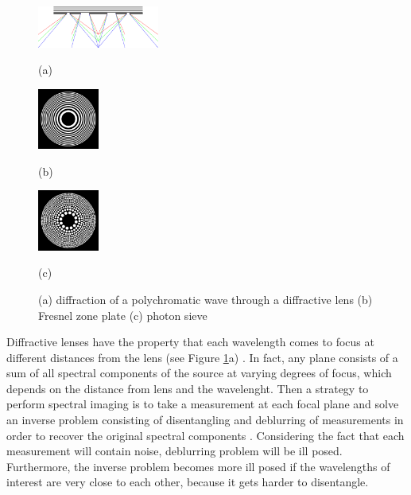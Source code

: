 \documentclass{article}
\begin{document}
\begin{figure}[htb]

\begin{minipage}[b]{0.48\linewidth}
  \centering
  \centerline{\includegraphics[width=4.0cm]{diffraction_ps_rgb}}
  \centerline{(a)}\medskip
\end{minipage}
\hfill
\begin{minipage}[b]{0.24\linewidth}
  \centering
  \centerline{\includegraphics[width=2.0cm]{zoneplate}}
  \centerline{(b)}\medskip
\end{minipage}
\hfill
\begin{minipage}[b]{0.24\linewidth}
  \centering
  \centerline{\includegraphics[width=2.0cm]{photonsieve}}
  \centerline{(c)}\medskip
\end{minipage}
\caption{(a) diffraction of a polychromatic wave through a diffractive lens (b) Fresnel zone
plate (c) photon sieve}
\label{fig:diff_lens}
%
\end{figure}

Diffractive lenses have the property that each wavelength comes to focus at
different distances from the lens (see Figure \ref{fig:diff_lens}a)
\cite{attwood2017x}. In fact, any plane consists of a sum of all spectral
components of the source at varying degrees of focus, which depends on the
distance from lens and the wavelenght. Then a strategy to perform spectral
imaging is to take a measurement at each focal plane and solve an inverse
problem consisting of disentangling and deblurring of measurements in order to
recover the original spectral components \cite{oktem2014icip}. Considering the
fact that each measurement will contain noise, deblurring problem will be ill
posed. Furthermore, the inverse problem becomes more ill posed if the wavelengths
of interest are very close to each other, because it gets harder to disentangle.
\end{document}
